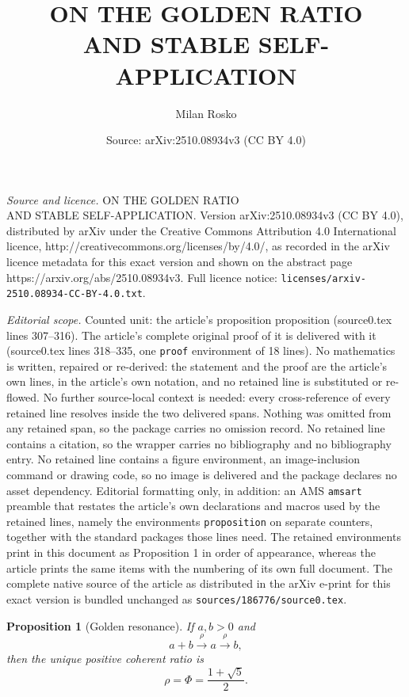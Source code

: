 \documentclass[10pt,a4paper]{amsart}
\title{\uppercase{ON THE GOLDEN RATIO\\AND STABLE SELF-APPLICATION}}
\author{Milan Rosko}
\date{Source: arXiv:2510.08934v3 (CC BY 4.0)}
\newtheorem{proposition}{Proposition}
\begin{document}
\maketitle

\noindent\emph{Source and licence.} \uppercase{ON THE GOLDEN RATIO\\AND STABLE SELF-APPLICATION}. Version arXiv:2510.08934v3 (CC BY 4.0), distributed by arXiv under the Creative Commons Attribution 4.0 International licence, http://creativecommons.org/licenses/by/4.0/, as recorded in the arXiv licence metadata for this exact version and shown on the abstract page https://arxiv.org/abs/2510.08934v3. Full licence notice: \texttt{licenses/arxiv-2510.08934-CC-BY-4.0.txt}.\par\smallskip

\noindent\textit{Editorial scope.} Counted unit: the article's proposition proposition (source0.tex lines 307--316). The article's complete original proof of it is delivered with it (source0.tex lines 318--335, one \texttt{proof} environment of 18 lines). No mathematics is written, repaired or re-derived: the statement and the proof are the article's own lines, in the article's own notation, and no retained line is substituted or re-flowed.  No further source-local context is needed: every cross-reference of every retained line resolves inside the two delivered spans.  Nothing was omitted from any retained span, so the package carries no omission record.  No retained line contains a citation, so the wrapper carries no bibliography and no bibliography entry.  No retained line contains a figure environment, an image-inclusion command or drawing code, so no image is delivered and the package declares no asset dependency.  Editorial formatting only, in addition: an AMS \texttt{amsart} preamble that restates the article's own declarations and macros used by the retained lines, namely the environments \texttt{proposition} on separate counters, together with the standard packages those lines need.  The retained environments print in this document as Proposition 1 in order of appearance, whereas the article prints the same items with the numbering of its own full document.  The complete native source of the article as distributed in the arXiv e-print for this exact version is bundled unchanged as \texttt{sources/186776/source0.tex}.
\begin{proposition}[Golden resonance]
	If $a,b>0$ and
	\begin{equation}
		a+b \xrightarrow{\rho} a \xrightarrow{\rho} b,
	\end{equation}
	then the unique positive coherent ratio is
	\begin{equation}
		\rho=\Phi=\frac{1+\sqrt5}{2}.
	\end{equation}
\end{proposition}
\end{document}
